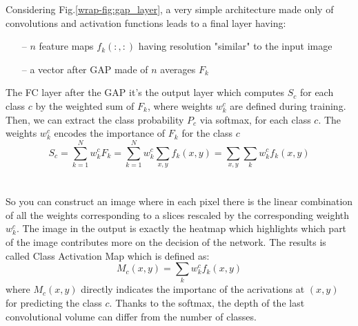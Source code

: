 Considering Fig.\ref{wrap-fig:gap_layer}, a very simple architecture made only of convolutions and activation functions leads to a final layer having: 
\begin{itemize}
    \item[--] $n$ feature maps $f_k(:,:)$ having resolution "similar" to the input image
    \item[--] a vector after GAP made of $n$ averages $F_k$
\end{itemize}
The FC layer after the GAP it's the output layer which computes $S_c$ for each class $c$ by the weighted sum of {$F_k$}, where weights $w_k^c$ are defined during training. Then, we can extract the class probability $P_c$ via softmax, for each class $c$. The weights $w_k^c$ encodes the importance of $F_k$ for the class $c$ 
$$
S_c = \sum_{k=1}^{N} w_k^{c}F_k = \sum_{k=1}^{N} w_k^{c} \sum_{x,y} f_k(x,y) = \sum_{x,y} \sum_{k} w_k^c f_k(x,y)
$$
\\ \\

So you can construct an image where in each pixel there is the linear combination of all the weights corresponding to a slices rescaled by the corresponding weighth $w_k^c$. The image in the output is exactly the heatmap which highlights which part of the image contributes more on the decision of the network. The results is called Class Activation Map which is defined as:
$$
M_{c}(x, y)=\sum_{k} w_{k}^{c} f_{k}(x, y)
$$
where $M_{c}(x, y)$ directly indicates the importanc of the acrivations at $(x,y)$ for predicting the class $c$. Thanks to the softmax, the depth of the last convolutional volume can differ from the number of classes. 


